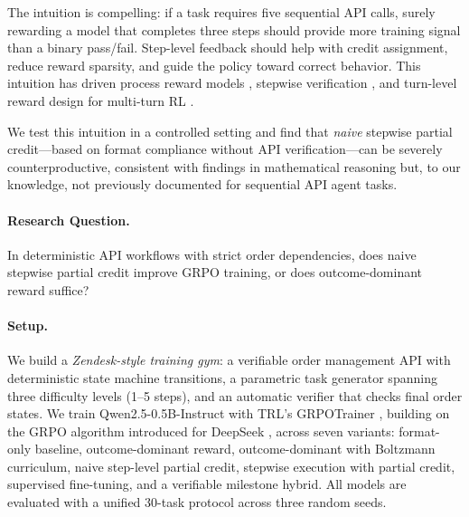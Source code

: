 \documentclass[11pt]{article}
\begin{document}
The intuition is compelling: if a task requires five sequential API calls, surely rewarding a model that completes three steps should provide more training signal than a binary pass/fail.
Step-level feedback should help with credit assignment, reduce reward sparsity, and guide the policy toward correct behavior.
This intuition has driven process reward models \citep{lightman2023lets,wang2024mathshepherd}, stepwise verification \citep{uesato2022solving}, and turn-level reward design for multi-turn RL \citep{zeng2025turnlevel}.

We test this intuition in a controlled setting and find that \emph{naive} stepwise partial credit---based on format compliance without API verification---can be severely counterproductive, consistent with findings in mathematical reasoning \citep{gao2024designing} but, to our knowledge, not previously documented for sequential API agent tasks.

\paragraph{Research Question.}
In deterministic API workflows with strict order dependencies, does naive stepwise partial credit improve GRPO training, or does outcome-dominant reward suffice?

\paragraph{Setup.}
We build a \emph{Zendesk-style training gym}: a verifiable order management API with deterministic state machine transitions, a parametric task generator spanning three difficulty levels (1--5 steps), and an automatic verifier that checks final order states.
We train Qwen2.5-0.5B-Instruct \citep{qwen2025qwen25} with TRL's GRPOTrainer \citep{trl2024}, building on the GRPO algorithm introduced for DeepSeek \citep{deepseek2025r1}, across seven variants: format-only baseline, outcome-dominant reward, outcome-dominant with Boltzmann curriculum, naive step-level partial credit, stepwise execution with partial credit, supervised fine-tuning, and a verifiable milestone hybrid.
All models are evaluated with a unified 30-task protocol across three random seeds.
\end{document}
